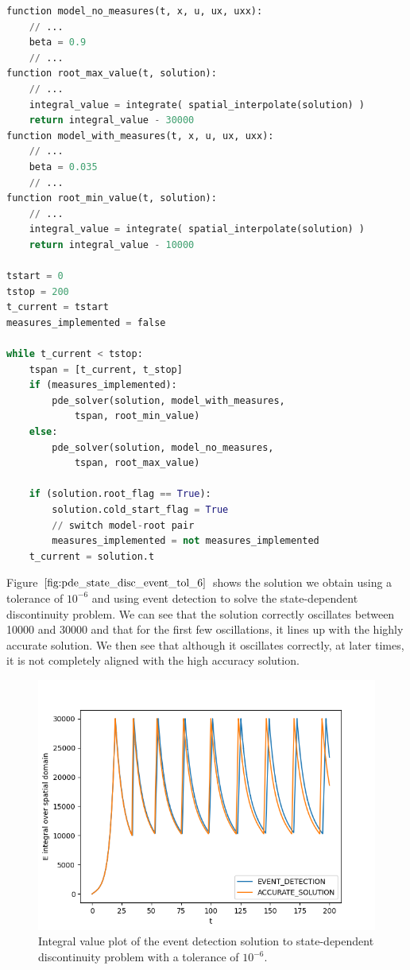 \begin{minipage}{\linewidth}
\begin{lstlisting}[language=Python]
function model_no_measures(t, x, u, ux, uxx):
	// ...
	beta = 0.9
	// ...
function root_max_value(t, solution):
	// ...
	integral_value = integrate( spatial_interpolate(solution) )
	return integral_value - 30000
function model_with_measures(t, x, u, ux, uxx):
	// ...
	beta = 0.035
	// ...
function root_min_value(t, solution):
	// ...
	integral_value = integrate( spatial_interpolate(solution) )
	return integral_value - 10000

tstart = 0
tstop = 200
t_current = tstart
measures_implemented = false

while t_current < tstop:
	tspan = [t_current, t_stop]
	if (measures_implemented):
		pde_solver(solution, model_with_measures, 
			tspan, root_min_value)
	else:
		pde_solver(solution, model_no_measures, 
			tspan, root_max_value)
	
	if (solution.root_flag == True):
		solution.cold_start_flag = True
		// switch model-root pair
		measures_implemented = not measures_implemented
	t_current = solution.t

\end{lstlisting}
\end{minipage}

Figure $\ref{fig:pde_state_disc_event_tol_6}$ shows the solution we obtain using a tolerance of $10^{-6}$ and using event detection to solve the state-dependent discontinuity problem. We can see that the solution correctly oscillates between 10000 and 30000 and that for the first few oscillations, it lines up with the highly accurate solution. We then see that although it oscillates correctly, at later times, it is not completely aligned with the high accuracy solution. 

\begin{figure}[H]
\centering
\includegraphics[width=0.7\linewidth]{./figures/pde_state_disc_event_tol_6}
\caption{Integral value plot of the event detection solution to state-dependent discontinuity problem with a tolerance of $10^{-6}$.}
\label{fig:pde_state_disc_event_tol_6}
\end{figure}

